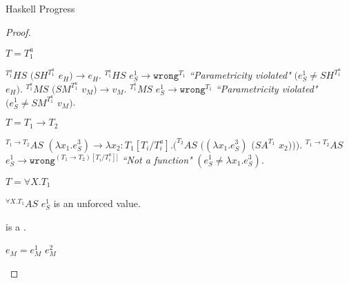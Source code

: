 \begin{theorem}{Haskell Progress}
\begin{proof}
\begin{case}
\begin{subcase}
\end{subcase}

\begin{subcase}

$T=T_{1}^{a}$

$^{T_{1}^{a}}HS$ $(SH^{T_{1}^{a}}$ $e_{H})\rightarrow e_{H}$.  $^{T_{1}^{a}}HS$ $e_{S}^{1}\rightarrow\mathtt{wrong}^{T_{1}}$ \emph{``Parametricity violated"} $(e_{S}^{1}\neq SH^{T_{1}^{a}}$ $e_{H})$.  $^{T_{1}^{a}}MS$ $(SM^{T_{1}^{a}}$ $v_{M})\rightarrow v_{M}$.  $^{T_{1}^{a}}MS$ $e_{S}^{1}\rightarrow\mathtt{wrong}^{T_{1}}$ \emph{``Parametricity violated"} $(e_{S}^{1}\neq SM^{T_{1}^{a}}$ $v_{M})$.

\end{subcase}

\begin{subcase}

$T=T_{1}\rightarrow T_{2}$

$^{T_{1}\rightarrow T_{2}}AS$ $(\lambda x_{1}.e_{S}^{3})\rightarrow\lambda x_{2}:T_{1}[T_{i}/T^{a}_{i}].(^{T_{2}}AS$ $((\lambda x_{1}.e_{S}^{3})$ $(SA^{T_{1}}$ $x_{2})))$.  $^{T_{1}\rightarrow T_{2}}AS$ $e_{S}^{1}\rightarrow\mathtt{wrong}^{(T_{1}\rightarrow T_{2})[T_{i}/T_{i}^{a}]]}$ \emph{``Not a function"} $(e_{S}^{1}\neq\lambda x_{1}.e_{S}^{3})$.

\end{subcase}

\begin{subcase}

$T=\forall X.T_{1}$

$^{\forall X.T_{1}}AS$ $e_{S}^{1}$ is an unforced value.

\end{subcase}

\end{case}



\newcommand{\psconsm}{\expcons{\first{\varvalum}}{\second{\varvalum}}\xspace}

\begin{case}

\psconsm

\psconsm is a \profv.

\end{case}


\begin{case}

$e_{M}=e_{M}^{1}$ $e_{M}^{2}$


\end{case}
\end{proof}
\end{theorem}
